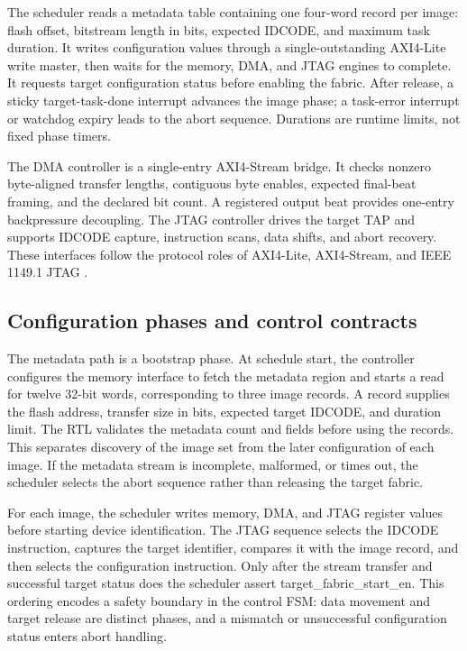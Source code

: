 \documentclass[conference]{IEEEtran}
\begin{document}
The scheduler reads a metadata table containing one four-word record per image: flash offset, bitstream length in bits, expected IDCODE, and maximum task duration. It writes configuration values through a single-outstanding AXI4-Lite write master, then waits for the memory, DMA, and JTAG engines to complete. It requests target configuration status before enabling the fabric. After release, a sticky target-task-done interrupt advances the image phase; a task-error interrupt or watchdog expiry leads to the abort sequence. Durations are runtime limits, not fixed phase timers.

The DMA controller is a single-entry AXI4-Stream bridge. It checks nonzero byte-aligned transfer lengths, contiguous byte enables, expected final-beat framing, and the declared bit count. A registered output beat provides one-entry backpressure decoupling. The JTAG controller drives the target TAP and supports IDCODE capture, instruction scans, data shifts, and abort recovery. These interfaces follow the protocol roles of AXI4-Lite, AXI4-Stream, and IEEE 1149.1 JTAG \cite{2,3}.

\subsection{Configuration phases and control contracts}

The metadata path is a bootstrap phase. At schedule start, the controller configures the memory interface to fetch the metadata region and starts a read for twelve 32-bit words, corresponding to three image records. A record supplies the flash address, transfer size in bits, expected target IDCODE, and duration limit. The RTL validates the metadata count and fields before using the records. This separates discovery of the image set from the later configuration of each image. If the metadata stream is incomplete, malformed, or times out, the scheduler selects the abort sequence rather than releasing the target fabric.

For each image, the scheduler writes memory, DMA, and JTAG register values before starting device identification. The JTAG sequence selects the IDCODE instruction, captures the target identifier, compares it with the image record, and then selects the configuration instruction. Only after the stream transfer and successful target status does the scheduler assert target\_fabric\_start\_en. This ordering encodes a safety boundary in the control FSM: data movement and target release are distinct phases, and a mismatch or unsuccessful configuration status enters abort handling.
\end{document}
